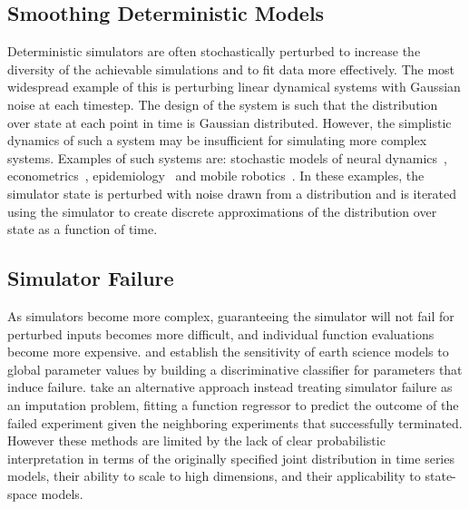 \subsection{Smoothing Deterministic Models}
Deterministic simulators are often stochastically perturbed to increase the diversity of the achievable simulations and to fit data more effectively.
The most widespread example of this is perturbing linear dynamical systems with Gaussian noise at each timestep.
The design of the system is such that the distribution over state at each point in time is Gaussian distributed.
However, the simplistic dynamics of such a system may be insufficient for simulating more complex systems.
Examples of such systems are: stochastic models of neural dynamics~\citep{fox1997stochastic, coutin2018fractional, goldwyn2011hh, Saarinen2008hh}, econometrics~\citep{lopes2011finance}, epidemiology~\citep{allen2017primer} and mobile robotics~\citep{thrun2001robust, fallon2012efficient}.
In these examples, the simulator state is perturbed with noise drawn from a distribution and is iterated using the simulator to create discrete approximations of the distribution over state as a function of time.

\subsection{Simulator Failure}
As simulators become more complex, guaranteeing the simulator will not fail for perturbed inputs becomes more difficult, and individual function evaluations become more expensive.
\citet{lucas2013failure} and \citet{edwards2011precalibrating} establish the sensitivity of earth science models to global parameter values by building a discriminative classifier for parameters that induce failure. 
\citet{gmd2019crash} take an alternative approach instead treating simulator failure as an imputation problem, fitting a function regressor to predict the outcome of the failed experiment given the neighboring experiments that successfully terminated.
However these methods are limited by the lack of clear probabilistic interpretation in terms of the originally specified joint distribution in time series models, their ability to scale to high dimensions, and their applicability to state-space models.

